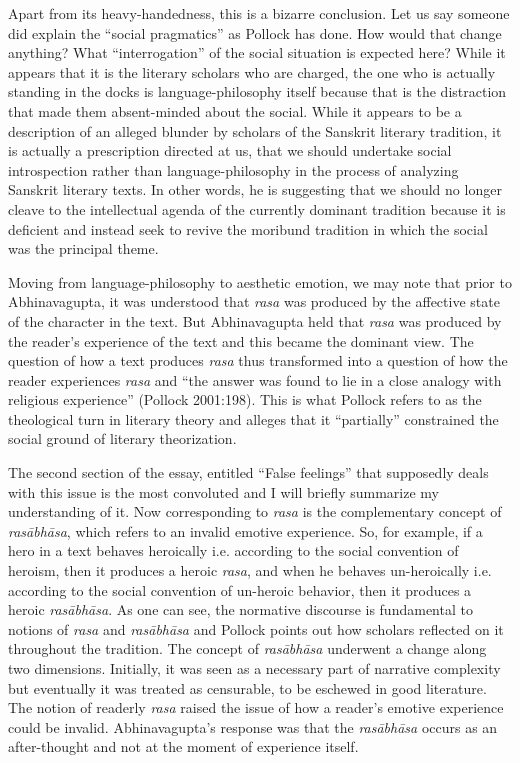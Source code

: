Apart from its heavy-handedness, this is a bizarre conclusion. Let us say someone did explain the ``social pragmatics'' as Pollock has done. How would that change anything? What ``interrogation'' of the social situation is expected here? While it appears that it is the literary scholars who are charged, the one who is actually standing in the docks is language-philosophy itself because that is the distraction that made them absent-minded about the social. While it appears to be a description of an alleged blunder by scholars of the Sanskrit literary tradition, it is actually a prescription directed at us, that we should undertake social introspection rather than language-philosophy in the process of analyzing Sanskrit literary texts. In other words, he is suggesting that we should no longer cleave to the intellectual agenda of the currently dominant tradition because it is deficient and instead seek to revive the moribund tradition in which the social was the principal theme.

Moving from language-philosophy to aesthetic emotion, we may note that prior to Abhinavagupta, it was understood that {\sl rasa} was produced by the affective state of the character in the text. But Abhinavagupta held that {\sl rasa} was produced by the reader's experience of the text and this became the dominant view. The question of how a text produces {\sl rasa} thus transformed into a question of how the reader experiences {\sl rasa} and ``the answer was found to lie in a close analogy with religious experience'' (Pollock 2001:198). This is what Pollock refers to as the theological turn in literary theory and alleges that it ``partially'' constrained the social ground of literary theorization.

The second section of the essay, entitled ``False feelings'' that supposedly deals with this issue is the most convoluted and I will briefly summarize my understanding of it. Now corresponding to {\sl rasa} is the complementary concept of {\sl rasābhāsa}, which refers to an invalid emotive experience. So, for example, if a hero in a text behaves heroically i.e. according to the social convention of heroism, then it produces a heroic {\sl rasa}, and when he behaves un-heroically i.e. according to the social convention of un-heroic behavior, then it produces a heroic {\sl rasābhāsa}. As one can see, the normative discourse is fundamental to notions of {\sl rasa} and {\sl rasābhāsa} and Pollock points out how scholars reflected on it throughout the tradition. The concept of {\sl rasābhāsa} underwent a change along two dimensions. Initially, it was seen as a necessary part of narrative complexity but eventually it was treated as censurable, to be eschewed in good literature. The notion of readerly {\sl rasa} raised the issue of how a reader's emotive experience could be invalid. Abhinavagupta's response was that the {\sl rasābhāsa} occurs as an after-thought and not at the moment of experience itself.

